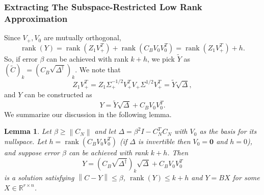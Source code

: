 \documentclass[11pt]{article}
\newcommand{\RR}{\mathbb{R}}
\newcommand{\rank}{\operatorname{rank}}
\newtheorem{lemma}[theorem]{Lemma}
\renewcommand{\math}[1]{$#1$}
\providecommand{\remove}[1]{}
\newcommand{\norm}[1]{\left\|#1\right\|}
\begin{document}
\subsubsection{Extracting The Subspace-Restricted Low Rank Approximation}
Since \math{V_+,V_0} are mutually orthogonal,
$$\rank(Y)=\rank(Z_1V_+^T)+\rank(C_BV_0V_0^T)=\rank(Z_1V_+^T)+h.$$
So, if error \math{\beta} can be achieved with rank 
\math{k+h}, we pick $\tilde Y$ as $(\tilde C)_k = (C_B\sqrt{\Delta^{\dagger}} )_k$.  We note that 
\[ Z_1 V_+ ^T = Z_1 {\Sigma}^{-1/2}_+V_+ ^T V_+ \Sigma^{1/2} V_+ ^T = \tilde Y \sqrt{\Delta},  \]
and $Y$ can be constructed as
\[ Y = \tilde Y \sqrt{\Delta} + C_B V_0 V_0 ^T. \]
We summarize our discussion in the following lemma.
\begin{lemma}\label{achievable}
Let \math{\beta\ge\norm{C_N}} and let \math{\Delta=\beta^2I-C_N^TC_N} with
\math{V_0} as the basis for its nullspace. Let 
\math{h=\rank(C_BV_0V_0^T)} (if \math{\Delta} is invertible then
\math{V_0=\bm0} and \math{h=0}), and suppose error \math{\beta} can be achieved with 
rank \math{k+h}.
Then 
$$
Y=(C_B \sqrt{\Delta^{\dagger}})_k \sqrt{\Delta} +C_BV_0V_0^T
$$
is a solution satisfying \math{\norm{C-Y}\le\beta}, 
\math{\rank(Y)\le k+h} and \math{Y=BX} for some \math{X\in\RR^{r\times n}}.
\end{lemma}
\remove{
\begin{lemma}\label{kstar h}
We can find $Y \in B$, with $rank(Y) = k^* + h$, such that, $\norm{C - Y} = \norm{C_N}$.\\
Furthermore, 
\[ Y = \Big((BB^{\dagger}C)V_+{\Sigma}^{-\frac{1}{2}}_+V_+^T\Big)_{k^*}V_+{\Sigma}^{\frac{1}{2}}_+V_+^T + (BB^{\dagger}C)V_0V_0^T\]
\end{lemma}
\noindent We can use similar arguments to have the following lemmas.
\begin{lemma}\label{k less kstar}
If \text{ }$k < k^*$,
\[ \norm{C - \Pi_{B, k}(C)} = \sigma_{k+1}(C), \] and
\[ \Pi_{B, k}(C) = \Big((BB^{\dagger}C)V_+{\Sigma}^{-\frac{1}{2}}_+V_+^T\Big)_{k}V_+{\Sigma}^{\frac{1}{2}}_+V_+^T\]
\end{lemma}
\noindent \\
However, when $k^* \leq k < k^*+h$, we may not achieve the minimum error $\norm{C_N}$. Instead, we can obtain an approximation with error arbitrarily close to $\norm{C_N}$.
\begin{lemma}\label{k less kstar h}
Let $\text{ }\beta = (1 + \epsilon)\norm{C_N}, \quad \epsilon > 0$. Then, 
\[ \Pi_{B, k}(C) = \Big(BB^{\dagger} C {\Delta}^{-\frac{1}{2}}_{\epsilon}\Big)_k {\Delta}^{\frac{1}{2}}_{\epsilon}\]
 where \quad $\Delta_{\epsilon}  = (1+\epsilon)^2\norm{C_N}^2I_n - C_N^TC_N$.
\end{lemma}
\noindent \\
}
\end{document}
